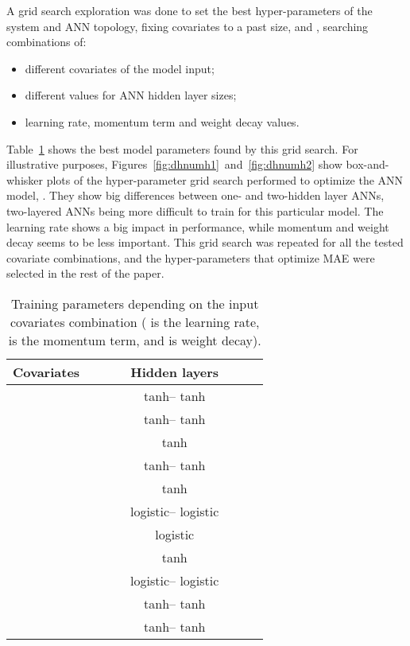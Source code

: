 \documentclass[energies,article,accept,moreauthors,pdftex,12pt,a4paper]{mdpi}
\newcommand{\ann}{ANN\xspace}
\newcommand{\anns}{ANNs\xspace}
\begin{document}
A grid search exploration was done to set the best hyper-parameters of the system
and \ann topology, fixing covariates  to a past size,  and , searching  \linebreak combinations of:
\vspace {-3 pt}

\begin{itemize}
\item different covariates of the model input;
\vspace {-9pt}
\item different values for \ann hidden layer sizes;
\vspace {-9pt}
\item learning rate, momentum term and weight decay values.
\end{itemize}
\vspace {-3 pt}

Table~\ref{tab:modelparams} shows the best model parameters found by this grid
search. For illustrative purposes, Figures~\ref{fig:dhnumh1}~and~\ref{fig:dhnumh2} show box-and-whisker plots of the hyper-parameter grid
search performed to optimize the \ann model, . They show big differences between one-
and two-hidden layer \anns, two-layered \anns being more difficult to train for this particular model. The learning rate shows a big impact in
performance, while momentum and weight decay seems to be less important. This
grid search was repeated for all the tested covariate combinations, and the
hyper-parameters that optimize MAE were selected in the rest of the
paper.

\begin{table}[H]
 \footnotesize \centering
 \begin{tabular}{cccccccc}
\toprule
 {\bf Covariates} & {\boldmath } & {\boldmath } & {\boldmath } & {\bf Hidden layers}\\
 \midrule
    &  &  &  &  tanh-- tanh\\
    &  &  &  &  tanh-- tanh\\
    &  &  &  &{ tanh}\\
    &  &  &  &  tanh-- tanh\\
    &  &  &  &{ tanh}\\
    &  &  &  &  logistic-- logistic\\
    &  &  &  &{ logistic}\\
   &  &  &  &{ tanh}\\
   &  &  &  &  logistic-- logistic\\
   &  &  &  &  tanh-- tanh\\
  &  &  &  &  tanh-- tanh\\
\bottomrule 
 \end{tabular}
 \normalsize
 \caption{Training parameters depending on the input covariates combination
 ( is the learning rate,  is the momentum term, and  is weight
 decay).}\label{tab:modelparams}
\end{table}
\end{document}
